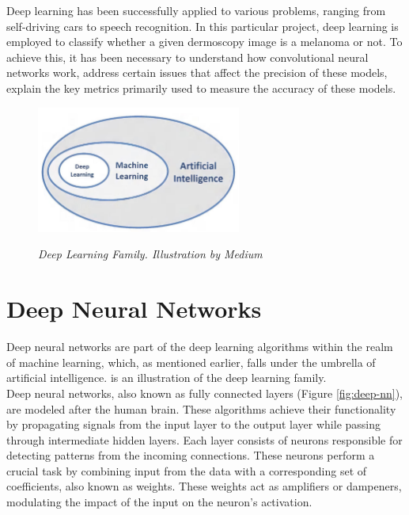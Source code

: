 Deep learning has been successfully applied to various problems, ranging from
self-driving cars to speech recognition. In this particular project, deep
learning is employed to classify whether a given dermoscopy image is a melanoma
or not. To achieve this, it has been necessary to understand how convolutional
neural networks work, address certain issues that affect the precision of these
models, explain the key metrics primarily used to measure the accuracy of these
models.

\newpage

\begin{figure}[H]
  \centering
  \includegraphics[width=0.6\textwidth]{imatges/preliminaries/deep-learning-family.jpg}
  \caption[Deep Learning Family]{\textit{Deep Learning Family. Illustration by Medium}}
  {\label{fig:deep-learning-family}}
\end{figure}

\section{Deep Neural Networks}

Deep neural networks are part of the deep learning algorithms within the realm
of machine learning, which, as mentioned earlier, falls under the umbrella of
artificial intelligence. is an
illustration of the deep learning family. \\


Deep neural networks, also known as fully connected layers (Figure
\ref{fig:deep-nn}), are modeled after the human brain. These algorithms achieve
their functionality by propagating signals from the input layer to the output
layer while passing through intermediate hidden layers. Each layer consists of
neurons responsible for detecting patterns from the incoming connections. These
neurons perform a crucial task by combining input from the data with a
corresponding set of coefficients, also known as weights. These weights act as
amplifiers or dampeners, modulating the impact of the input on the neuron's
activation. \\


